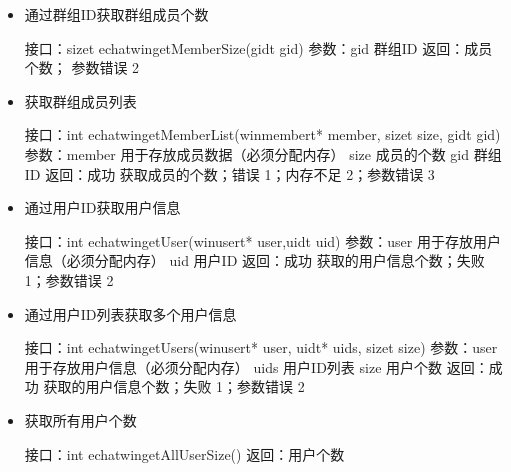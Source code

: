 \documentclass[letterpaper,10pt,english]{sphinxmanual}
\begin{document}
\begin{itemize}
\item {} 
通过群组ID获取群组成员个数

%
\begin{sphinxVerbatim}[commandchars=\\\{\}]
接口：size\PYGZus{}t echat\PYGZus{}win\PYGZus{}getMemberSize(gid\PYGZus{}t gid)
参数：gid  群组ID
返回：成员个数； 参数错误 \PYGZhy{}2
\end{sphinxVerbatim}

\item {} 
获取群组成员列表

%
\begin{sphinxVerbatim}[commandchars=\\\{\}]
接口：int echat\PYGZus{}win\PYGZus{}getMemberList(win\PYGZus{}member\PYGZus{}t* member, size\PYGZus{}t size, gid\PYGZus{}t gid)
参数：member  用于存放成员数据（必须分配内存）
  size  成员的个数
  gid  群组ID
返回：成功  获取成员的个数；错误  \PYGZhy{}1；内存不足  \PYGZhy{}2；参数错误  \PYGZhy{}3
\end{sphinxVerbatim}

\item {} 
通过用户ID获取用户信息

%
\begin{sphinxVerbatim}[commandchars=\\\{\}]
接口：int echat\PYGZus{}win\PYGZus{}getUser(win\PYGZus{}user\PYGZus{}t* user,uid\PYGZus{}t uid)
参数：user  用于存放用户信息（必须分配内存）
  uid  用户ID
返回：成功 获取的用户信息个数；失败 \PYGZhy{}1；参数错误  \PYGZhy{}2
\end{sphinxVerbatim}

\item {} 
通过用户ID列表获取多个用户信息

%
\begin{sphinxVerbatim}[commandchars=\\\{\}]
接口：int echat\PYGZus{}win\PYGZus{}getUsers(win\PYGZus{}user\PYGZus{}t* user, uid\PYGZus{}t* uids, size\PYGZus{}t size)
参数：user  用于存放用户信息（必须分配内存）
  uids  用户ID列表
  size  用户个数
返回：成功 获取的用户信息个数；失败 \PYGZhy{}1；参数错误  \PYGZhy{}2
\end{sphinxVerbatim}

\item {} 
获取所有用户个数

%
\begin{sphinxVerbatim}[commandchars=\\\{\}]
接口：int echat\PYGZus{}win\PYGZus{}getAllUserSize()
返回：用户个数
\end{sphinxVerbatim}


\end{itemize}
\end{document}
